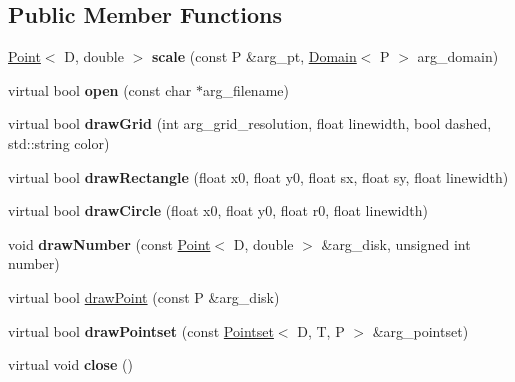 \subsection*{Public Member Functions}
\begin{DoxyCompactItemize}
\item 
\hypertarget{classutk_1_1PointsetIllustrator__PS_a17c9a87570add454e01341fafb22ef9b}{\hyperlink{classutk_1_1Point}{Point}$<$ D, double $>$ {\bfseries scale} (const P \&arg\-\_\-pt, \hyperlink{structutk_1_1Domain}{Domain}$<$ P $>$ arg\-\_\-domain)}\label{classutk_1_1PointsetIllustrator__PS_a17c9a87570add454e01341fafb22ef9b}

\item 
\hypertarget{classutk_1_1PointsetIllustrator__PS_a8f29e097221c0d599b75a7ed9917991a}{virtual bool {\bfseries open} (const char $\ast$arg\-\_\-filename)}\label{classutk_1_1PointsetIllustrator__PS_a8f29e097221c0d599b75a7ed9917991a}

\item 
\hypertarget{classutk_1_1PointsetIllustrator__PS_a3ee89e11a392534a2010830744b91124}{virtual bool {\bfseries draw\-Grid} (int arg\-\_\-grid\-\_\-resolution, float linewidth, bool dashed, std\-::string color)}\label{classutk_1_1PointsetIllustrator__PS_a3ee89e11a392534a2010830744b91124}

\item 
\hypertarget{classutk_1_1PointsetIllustrator__PS_a4577595adc2ac3f491a3a7dc2d8446fb}{virtual bool {\bfseries draw\-Rectangle} (float x0, float y0, float sx, float sy, float linewidth)}\label{classutk_1_1PointsetIllustrator__PS_a4577595adc2ac3f491a3a7dc2d8446fb}

\item 
\hypertarget{classutk_1_1PointsetIllustrator__PS_a089577fb97815fe4c2259a66212d8a0f}{virtual bool {\bfseries draw\-Circle} (float x0, float y0, float r0, float linewidth)}\label{classutk_1_1PointsetIllustrator__PS_a089577fb97815fe4c2259a66212d8a0f}

\item 
\hypertarget{classutk_1_1PointsetIllustrator__PS_a7127af14c05c2068e89dcf89d75e0de0}{void {\bfseries draw\-Number} (const \hyperlink{classutk_1_1Point}{Point}$<$ D, double $>$ \&arg\-\_\-disk, unsigned int number)}\label{classutk_1_1PointsetIllustrator__PS_a7127af14c05c2068e89dcf89d75e0de0}

\item 
virtual bool \hyperlink{classutk_1_1PointsetIllustrator__PS_a6e7bb811bc881f7035e32cb458778272}{draw\-Point} (const P \&arg\-\_\-disk)
\item 
\hypertarget{classutk_1_1PointsetIllustrator__PS_a1639442b1bac62f311178e046c31d4c2}{virtual bool {\bfseries draw\-Pointset} (const \hyperlink{classutk_1_1Pointset}{Pointset}$<$ D, T, P $>$ \&arg\-\_\-pointset)}\label{classutk_1_1PointsetIllustrator__PS_a1639442b1bac62f311178e046c31d4c2}

\item 
\hypertarget{classutk_1_1PointsetIllustrator__PS_a4d7cc1ad3dc4cfeb1334e18a2866bef7}{virtual void {\bfseries close} ()}\label{classutk_1_1PointsetIllustrator__PS_a4d7cc1ad3dc4cfeb1334e18a2866bef7}

\end{DoxyCompactItemize}
